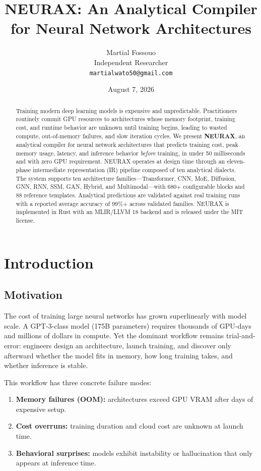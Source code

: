 \documentclass[11pt]{article}
\title{\textbf{NEURAX: An Analytical Compiler for Neural Network Architectures}}
\author{Martial Fossouo\\
Independent Researcher\\
\texttt{martialwato50@gmail.com}}
\date{August 7, 2026}
\begin{document}
\maketitle

\begin{abstract}
Training modern deep learning models is expensive and unpredictable. Practitioners routinely commit GPU resources to architectures whose memory footprint, training cost, and runtime behavior are unknown until training begins, leading to wasted compute, out-of-memory failures, and slow iteration cycles. We present \textbf{NEURAX}, an analytical compiler for neural network architectures that predicts training cost, peak memory usage, latency, and inference behavior \emph{before} training, in under 50 milliseconds and with zero GPU requirement. NEURAX operates at design time through an eleven-phase intermediate representation (IR) pipeline composed of ten analytical dialects. The system supports ten architecture families---Transformer, CNN, MoE, Diffusion, GNN, RNN, SSM, GAN, Hybrid, and Multimodal---with 680+ configurable blocks and 88 reference templates. Analytical predictions are validated against real training runs with a reported average accuracy of 99\%+ across validated families. NEURAX is implemented in Rust with an MLIR/LLVM 18 backend and is released under the MIT license.
\end{abstract}

\section{Introduction}

\subsection{Motivation}

The cost of training large neural networks has grown superlinearly with model scale. A GPT-3-class model (175B parameters) requires thousands of GPU-days and millions of dollars in compute. Yet the dominant workflow remains trial-and-error: engineers design an architecture, launch training, and discover only afterward whether the model fits in memory, how long training takes, and whether inference is stable.

This workflow has three concrete failure modes:
\begin{enumerate}
  \item \textbf{Memory failures (OOM):} architectures exceed GPU VRAM after days of expensive setup.
  \item \textbf{Cost overruns:} training duration and cloud cost are unknown at launch time.
  \item \textbf{Behavioral surprises:} models exhibit instability or hallucination that only appears at inference time.
\end{enumerate}
\end{document}
